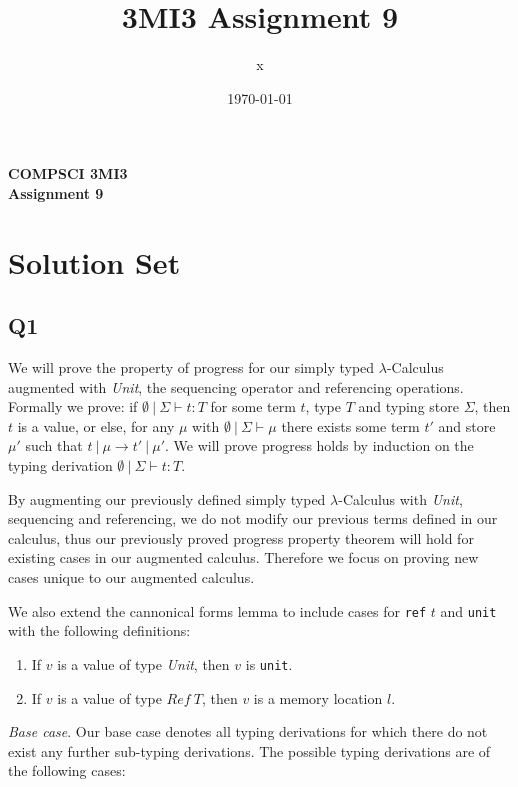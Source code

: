 \documentclass[12pt, fleqn]{article}
\title{3MI3 Assignment 9}
\author{x}
\date{\today}
\begin{document}
\begin{center}

    {\large \textbf{COMPSCI 3MI3}}\\[8mm]
    {\huge \textbf{Assignment 9}}\\[6mm]
  
\end{center}

\medskip

\section{Solution Set}

\subsection{Q1}

We will prove the property of progress for our simply typed $\lambda$-Calculus augmented with \emph{Unit}, the sequencing operator and referencing operations. Formally we prove: if $\emptyset\:|\:\Sigma \vdash t: T$ for some term $t$, type $T$ and typing store $\Sigma$, then $t$ is a value, or else, for any $\mu$ with $\emptyset\:|\:\Sigma \vdash \mu$ there exists some term $t'$ and store $\mu'$ such that $t\:|\:\mu \rightarrow t'\:|\:\mu'$. 
We will prove progress holds by induction on the typing derivation $\emptyset\:|\:\Sigma \vdash t : T$.

\medskip
By augmenting our previously defined simply typed $\lambda$-Calculus with \emph{Unit}, sequencing and referencing,  we do not modify our previous terms defined in our calculus, thus our previously proved progress property theorem will hold for existing cases in our augmented calculus. Therefore we focus on proving new cases unique to our augmented calculus.

\medskip
We also extend the cannonical forms lemma to include cases for \texttt{ref} $t$ and \texttt{unit} with the following definitions:
\begin{enumerate}[(1)]
    \item If $v$ is a value of type \emph{Unit}, then $v$ is \texttt{unit}.
    \item If $v$ is a value of type $Ref\:T$, then $v$ is a memory location $l$.
\end{enumerate}

\medskip
\emph{Base case}. Our base case denotes all typing derivations for which there do not exist any further sub-typing derivations. The possible typing derivations are of the following cases:
\end{document}
